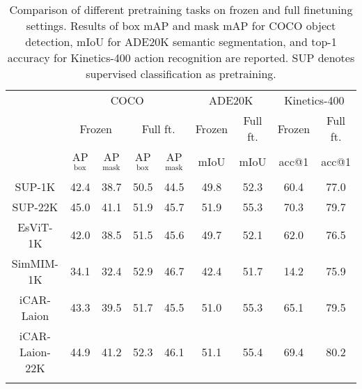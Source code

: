 \documentclass{article}
\begin{document}
\begin{table}[htb]
        \centering
\addtolength{\tabcolsep}{-1.0pt}
        \begin{tabular}{c|cccc|cc|cc}
            \Xhline{1.0pt}
            \multirow{3}{*}{Approach} & \multicolumn{4}{c|}{COCO} & \multicolumn{2}{c|}{ADE20K} & \multicolumn{2}{c}{Kinetics-400}\\
            & \multicolumn{2}{c}{Frozen}& \multicolumn{2}{c|}{Full ft.} & Frozen & Full ft. & Frozen & Full ft. \\
            & AP$^\text{box}$ & AP$^\text{mask}$ & AP$^\text{box}$ & AP$^\text{mask}$ & mIoU & mIoU & acc@1 & acc@1 \\
            \hline
            SUP-1K & 42.4 & 38.7 & 50.5 & 44.5 & 49.8 & 52.3 & 60.4 & 77.0 \\
            SUP-22K & 45.0 & 41.1 & 51.9 & 45.7 & 51.9 & 55.3 & 70.3 & 79.7 \\
            EsViT-1K & 42.0 & 38.5 & 51.5 & 45.6 & 49.7 & 52.1 & 62.0 & 76.5 \\
            SimMIM-1K & 34.1 & 32.4 & 52.9 & 46.7 & 42.4 & 51.7 & 14.2 & 75.9 \\
            iCAR-Laion & 43.3 & 39.5 & 51.7 & 45.5 & 51.0 & 55.3 & 65.1 & 79.5 \\
            iCAR-Laion-22K & 44.9 & 41.2 & 52.3 & 46.1 & 51.1 & 55.4 & 69.4 & 80.2 \\
          \Xhline{1.0pt}  
       \end{tabular}
     \caption{Comparison of different pretraining tasks on frozen and full finetuning settings. Results of box mAP and mask mAP for COCO object detection, mIoU for ADE20K semantic segmentation, and top-1 accuracy for Kinetics-400 action recognition are reported. SUP denotes supervised classification as pretraining.}
     \label{tab:pretrain_task}
\end{table}
\end{document}
